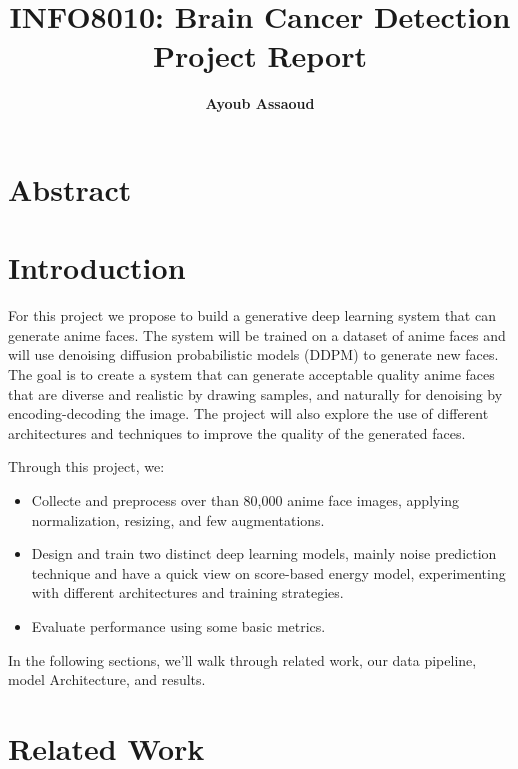 \documentclass[twocolumn,superscriptaddress,aps]{revtex4-1}
\begin{document}

\title{\Large{INFO8010: Brain Cancer Detection Project Report}}
\vspace{1cm}
\author{\small{\bf Ayoub Assaoud}}

\maketitle
\section{Abstract}

\section{Introduction}

For this project we propose to build a generative deep learning system that can generate anime faces. The system will be trained on a dataset of anime faces and will use denoising diffusion probabilistic models (DDPM) to generate new faces. The goal is to create a system that can generate acceptable quality anime faces that are diverse and realistic by drawing samples, and naturally for denoising by encoding-decoding the image. The project will also explore the use of different architectures and techniques to improve the quality of the generated faces.

Through this project, we:

\begin{itemize}
        \item Collecte and preprocess over than 80,000 anime face images, applying normalization, resizing, and few augmentations.
        \item Design and train two distinct deep learning models, mainly noise prediction technique and have a quick view on score-based energy model, experimenting with different architectures and training strategies.
        \item Evaluate performance using some basic metrics.
    \end{itemize}

In the following sections, we'll walk through related work, our data pipeline, model Architecture, and results.

\section{Related Work}
\end{document}
